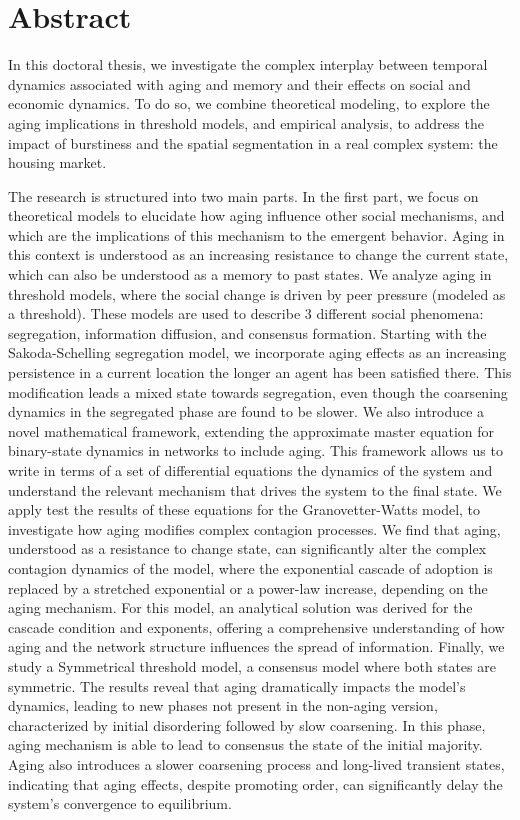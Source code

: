 \pagebreak
\thispagestyle{empty}
\section*{Abstract}

In this doctoral thesis, we investigate the complex interplay between temporal dynamics associated with aging and memory and their effects on social and economic dynamics. To do so, we combine theoretical modeling, to explore the aging implications in threshold models, and empirical analysis, to address the impact of burstiness and the spatial segmentation in a real complex system: the housing market. 

The research is structured into two main parts. In the first part, we focus on theoretical models to elucidate how aging influence other social mechanisms, and which are the implications of this mechanism to the emergent behavior. Aging in this context is understood as an increasing resistance to change the current state, which can also be understood as a memory to past states. We analyze aging in threshold models, where the social change is driven by peer pressure (modeled as a threshold). These models are used to describe 3 different social phenomena: segregation, information diffusion, and consensus formation. Starting with the Sakoda-Schelling segregation model, we incorporate aging effects as an increasing persistence in a current location the longer an agent has been satisfied there. This modification leads a mixed state towards segregation, even though the coarsening dynamics in the segregated phase are found to be slower. We also introduce a novel mathematical framework, extending the approximate master equation for binary-state dynamics in networks to include aging. This framework allows us to write in terms of a set of differential equations the dynamics of the system and understand the relevant mechanism that drives the system to the final state. We apply test the results of these equations for the Granovetter-Watts model, to investigate how aging modifies complex contagion processes. We find that aging, understood as a resistance to change state, can significantly alter the complex contagion dynamics of the model, where the exponential cascade of adoption is replaced by a stretched exponential or a power-law increase, depending on the aging mechanism. For this model, an analytical solution was derived for the cascade condition and exponents, offering a comprehensive understanding of how aging and the network structure influences the spread of information. Finally, we study a Symmetrical threshold model, a consensus model where both states are symmetric. The results reveal that aging dramatically impacts the model's dynamics, leading to new phases not present in the non-aging version, characterized by initial disordering followed by slow coarsening. In this phase, aging mechanism is able to lead to consensus the state of the initial majority. Aging also introduces a slower coarsening process and long-lived transient states, indicating that aging effects, despite promoting order, can significantly delay the system's convergence to equilibrium.


